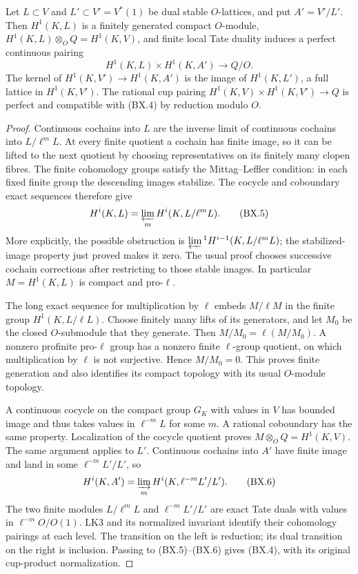 \begin{proposition}
\label{claim:BX3}
Let $L\subset V$ and $L'\subset V'=V^*(1)$ be dual stable
$O$-lattices, and put $A'=V'/L'$.
Then $H^1(K,L)$ is a finitely generated compact $O$-module,
$H^1(K,L)\otimes_OQ=H^1(K,V)$, and finite local Tate duality
induces a perfect continuous pairing
\[
 H^1(K,L)\times H^1(K,A')\longrightarrow Q/O.                    \tag{BX.4}
\]
The kernel of $H^1(K,V')\to H^1(K,A')$ is the image of
$H^1(K,L')$, a full lattice in $H^1(K,V')$.
The rational cup pairing
$H^1(K,V)\times H^1(K,V')\to Q$ is perfect and compatible
with (BX.4) by reduction modulo $O$.
\end{proposition}
\begin{proof}
Continuous cochains into $L$ are the inverse limit of continuous
cochains into $L/\ell^mL$.  At every finite quotient a cochain
has finite image, so it can be lifted to the next quotient by
choosing representatives on its finitely many clopen fibres.
The finite cohomology groups satisfy the Mittag--Leffler
condition: in each fixed finite group the descending images
stabilize.  The cocycle and coboundary exact sequences therefore
give
\[
 H^i(K,L)=\varprojlim_m H^i(K,L/\ell^mL).
                                                               \tag{BX.5}
\]
More explicitly, the possible obstruction is
$\varprojlim{}^1H^{i-1}(K,L/\ell^mL)$; the stabilized-image
property just proved makes it zero.  The usual proof chooses
successive cochain corrections after restricting to those
stable images.  In particular $M=H^1(K,L)$ is compact and
pro-$\ell$.

The long exact sequence for multiplication by $\ell$ embeds
$M/\ell M$ in the finite group $H^1(K,L/\ell L)$.
Choose finitely many lifts of its generators, and let $M_0$
be the closed $O$-submodule that they generate.  Then
$M/M_0=\ell(M/M_0)$.  A nonzero profinite pro-$\ell$ group has
a nonzero finite $\ell$-group quotient, on which multiplication
by $\ell$ is not surjective.  Hence $M/M_0=0$.
This proves finite generation and also identifies its compact
topology with its usual $O$-module topology.

A continuous cocycle on the compact group $G_K$ with values in
$V$ has bounded image and thus takes values in $\ell^{-m}L$
for some $m$.  A rational coboundary has the same property.
Localization of the cocycle quotient proves
$M\otimes_OQ=H^1(K,V)$.  The same argument applies to $L'$.
Continuous cochains into $A'$ have finite image and land in
some $\ell^{-m}L'/L'$, so
\[
 H^i(K,A')=\varinjlim_m H^i(K,\ell^{-m}L'/L').
                                                               \tag{BX.6}
\]
The two finite modules $L/\ell^mL$ and
$\ell^{-m}L'/L'$ are exact Tate duals with values in
$\ell^{-m}O/O(1)$.  LK3 and its normalized invariant identify
their cohomology pairings at each level.  The transition on the
left is reduction; its dual transition on the right is
inclusion.  Passing to (BX.5)--(BX.6) gives (BX.4), with its
original cup-product normalization.


\end{proof}
